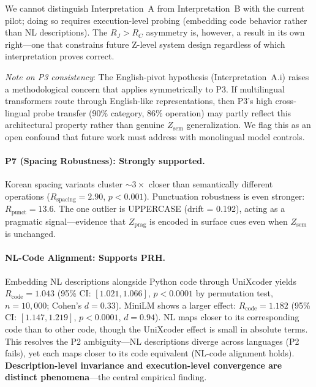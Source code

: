 \documentclass{article}
\theoremstyle{definition}
\newcommand{\Zsem}{Z_{\text{sem}}}
\newcommand{\Zprag}{Z_{\text{prag}}}
\begin{document}
We cannot distinguish Interpretation~A from Interpretation~B with the current pilot; doing so requires execution-level probing (embedding code behavior rather than NL descriptions). The $R_J > R_C$ asymmetry is, however, a result in its own right---one that constrains future Z-level system design regardless of which interpretation proves correct.

\emph{Note on P3 consistency}: The English-pivot hypothesis (Interpretation~A.i) raises a methodological concern that applies symmetrically to P3. If multilingual transformers route through English-like representations, then P3's high cross-lingual probe transfer (90\% category, 86\% operation) may partly reflect this architectural property rather than genuine $\Zsem$ generalization. We flag this as an open confound that future work must address with monolingual model controls.

\paragraph{P7 (Spacing Robustness): Strongly supported.}
Korean spacing variants cluster ${\sim}3\times$ closer than semantically different operations ($R_{\text{spacing}} = 2.90$, $p < 0.001$). Punctuation robustness is even stronger: $R_{\text{punct}} = 13.6$. The one outlier is UPPERCASE (drift = 0.192), acting as a pragmatic signal---evidence that $\Zprag$ is encoded in surface cues even when $\Zsem$ is unchanged.

\paragraph{NL-Code Alignment: Supports PRH.}
Embedding NL descriptions alongside Python code through UniXcoder yields $R_{\text{code}} = 1.043$ (95\% CI: $[1.021, 1.066]$, $p < 0.0001$ by permutation test, $n = 10{,}000$; Cohen's $d = 0.33$). MiniLM shows a larger effect: $R_{\text{code}} = 1.182$ (95\% CI: $[1.147, 1.219]$, $p < 0.0001$, $d = 0.94$). NL maps closer to its corresponding code than to other code, though the UniXcoder effect is small in absolute terms. This resolves the P2 ambiguity---NL descriptions diverge across languages (P2 fails), yet each maps closer to its code equivalent (NL-code alignment holds). \textbf{Description-level invariance and execution-level convergence are distinct phenomena}---the central empirical finding.
\end{document}
